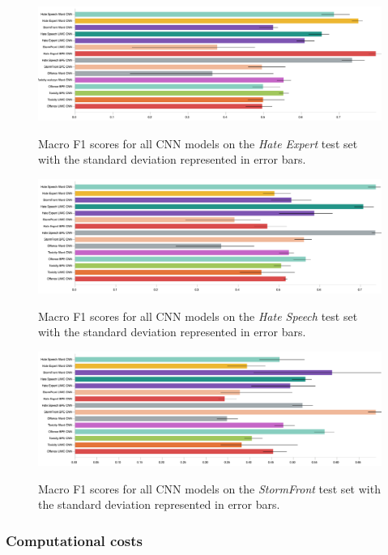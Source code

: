 \begin{figure}
\begin{minipage}{\textwidth}
\centering
    \includegraphics[width=\textwidth]{all_cnn_waseem_test.pdf}
    \caption{Macro F1 scores for all CNN models on the \textit{Hate Expert} test set with the standard deviation represented in error bars.}
    \label{fig:waseem_cnn_test}
    \vfill
    \includegraphics[width=\textwidth]{all_cnn_waseem_hovy_test.pdf}
    \caption{Macro F1 scores for all CNN models on the \textit{Hate Speech} test set with the standard deviation represented in error bars.}
  \label{fig:waseem_hovy_cnn_test}  
    \includegraphics[width=\textwidth]{all_cnn_garcia_test.pdf}
  \caption{Macro F1 scores for all CNN models on the \textit{StormFront} test set with the standard deviation represented in error bars.}
  \label{fig:garcia_cnn_test}
\end{minipage}
\end{figure}


\subsubsection{Computational costs}


